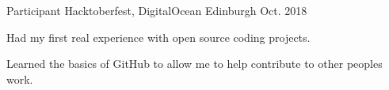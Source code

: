 \begin{cventries}

  \cventry
    {Participant} %
    {Hacktoberfest, DigitalOcean} %
    {Edinburgh} %
    {Oct. 2018} %
    {
      \begin{cvitems} %
        \item {Had my first real experience with open source coding projects.}
        \item {Learned the basics of GitHub to allow me to help contribute to other peoples work.}
      \end{cvitems}
    }



\end{cventries}
